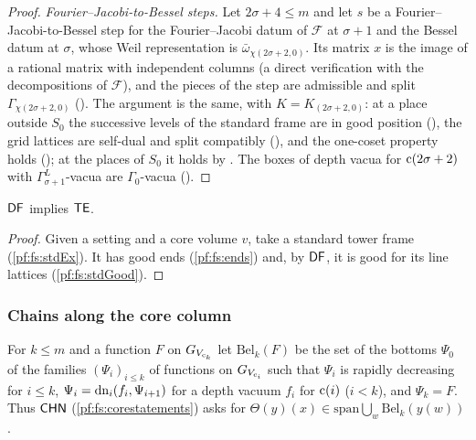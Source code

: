 \begin{proof}
\emph{Fourier--Jacobi-to-Bessel steps.} Let $2\sigma+4\le m$ and let $s$ be a Fourier--Jacobi-to-Bessel step for the Fourier--Jacobi datum of
$\mathcal F$ at $\sigma+1$ and the Bessel datum at $\sigma$, whose Weil representation is $\bar\omega_{\chi(2\sigma+2,0)}$. Its matrix $x$ is the
image of a rational matrix with independent columns (a direct verification with the decompositions of $\mathcal F$), and the pieces of the step
are admissible and split
$\Gamma_{\chi(2\sigma+2,0)}$ (). The argument is the same, with
$K=K_{(2\sigma+2,0)}$: at a place outside $S_0$ the successive levels of the standard frame are in good position
(), the grid lattices are self-dual and split compatibly
(), and the one-coset property holds
(); at the places of $S_0$ it holds by
. The boxes of depth vacua for $\mathrm{c}(2\sigma+2)$ with $\Gamma^L_{\sigma+1}$-vacua are
$\Gamma_0$-vacua ().
\end{proof}

\begin{theorem}\label{pf:fs:towerEx}
$\mathsf{DF}$ implies $\mathsf{TE}$.
\end{theorem}

\begin{proof}
Given a setting and a core volume $v$, take a standard tower frame (\cref{pf:fs:stdEx}). It has good ends (\cref{pf:fs:ends}) and, by
$\mathsf{DF}$, it is good for its line lattices (\cref{pf:fs:stdGood}).
\end{proof}

\subsubsection{Chains along the core column}

For $k\le m$ and a function $F$ on $G_{V_{\mathrm{c}_k}}$ let $\mathrm{Bel}_k(F)$ be the set of the bottoms $\Psi_0$ of the families $(\Psi_i)_{i\le k}$
of functions on $G_{V_{\mathrm{c}_i}}$ such that $\Psi_i$ is rapidly decreasing for $i\le k$, $\Psi_i=\mathrm{dn}_i(f_i,\Psi_{i+1})$ for a depth vacuum
$f_i$ for $\mathrm{c}(i)$ ($i<k$), and $\Psi_k=F$. Thus $\mathsf{CHN}$ (\cref{pf:fs:corestatements}) asks for $\Theta(y)(x)\in\mathrm{span}\bigcup_w
\mathrm{Bel}_k(y(w))$.

